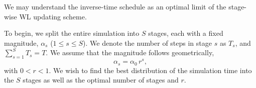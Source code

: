 \documentclass[reprint, superscriptaddress, floatfix]{revtex4-1}
\begin{document}
We may understand the inverse-time schedule %
as an optimal limit of the stage-wise WL updating scheme.
%

To begin, we split the entire simulation into $S$ stages,
each with a fixed magnitude, $\alpha_s$ ($1 \le s \le S$).
%
We denote the number of steps in stage $s$ as $T_s$, and
$\sum_{s=1}^S T_s = T$.
%
%
We assume that
the magnitude follows geometrically,
%
\begin{equation}
  \alpha_s = \alpha_0 \, r^s
  ,
  \label{eq:alphas}
\end{equation}
%
with $0 < r < 1$.
%
%
We wish to find the best distribution of the simulation time
into the $S$ stages
as well as
the optimal number of stages and $r$.
\end{document}
